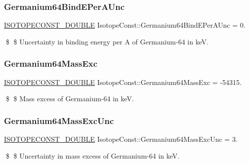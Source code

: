 \subsubsection{\texorpdfstring{Germanium64\+Bind\+E\+Per\+A\+Unc}{Germanium64BindEPerAUnc}}
{\footnotesize\ttfamily \mbox{\hyperlink{group___isotope_const-_macros_ga8f45a7272ce02c0b4c65c44636ed719a}{I\+S\+O\+T\+O\+P\+E\+C\+O\+N\+S\+T\+\_\+\+D\+O\+U\+B\+LE}} Isotope\+Const\+::\+Germanium64\+Bind\+E\+Per\+A\+Unc = 0.}

\$ \$ Uncertainty in binding energy per A of Germanium-\/64 in keV. \mbox{\label{group___isotope_const-_germanium-_ge64_ga61bbeb4c1588360ddc847c21dcd4a619}} 
\subsubsection{\texorpdfstring{Germanium64\+Mass\+Exc}{Germanium64MassExc}}
{\footnotesize\ttfamily \mbox{\hyperlink{group___isotope_const-_macros_ga8f45a7272ce02c0b4c65c44636ed719a}{I\+S\+O\+T\+O\+P\+E\+C\+O\+N\+S\+T\+\_\+\+D\+O\+U\+B\+LE}} Isotope\+Const\+::\+Germanium64\+Mass\+Exc = -\/54315.}

\$ \$ Mass excess of Germanium-\/64 in keV. \mbox{\label{group___isotope_const-_germanium-_ge64_gad2fd6d4ff3f3110cb31438b06056eea0}} 
\subsubsection{\texorpdfstring{Germanium64\+Mass\+Exc\+Unc}{Germanium64MassExcUnc}}
{\footnotesize\ttfamily \mbox{\hyperlink{group___isotope_const-_macros_ga8f45a7272ce02c0b4c65c44636ed719a}{I\+S\+O\+T\+O\+P\+E\+C\+O\+N\+S\+T\+\_\+\+D\+O\+U\+B\+LE}} Isotope\+Const\+::\+Germanium64\+Mass\+Exc\+Unc = 3.}

\$ \$ Uncertainty in mass excess of Germanium-\/64 in keV. \mbox{\label{group___isotope_const-_germanium-_ge64_gaa611e1e1815c658b923baefb54d3b133}} 
